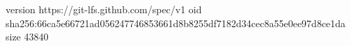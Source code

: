 version https://git-lfs.github.com/spec/v1
oid sha256:66ca5e66721ad056247746853661d8b8255df7182d34cec8a55e0ee97d8ce1da
size 43840
